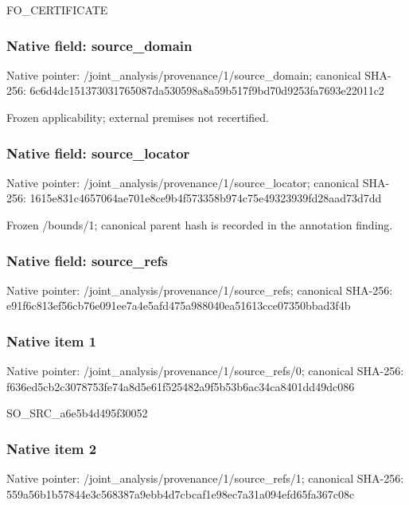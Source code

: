 \documentclass[10pt,a4paper]{article}
\begin{document}
\begingroup\raggedright\sloppy FO\_\allowbreak{}CERTIFICATE\par\endgroup

\subsubsection{Native field: source\_\allowbreak{}domain}
Native pointer: /joint\_\allowbreak{}analysis/provenance/1/source\_\allowbreak{}domain; canonical SHA-256: 6c6d4dc151373031765087da530598a8a59b517f9bd70d9253fa7693e22011c2

\begingroup\raggedright\sloppy Frozen applicability;\allowbreak{} external premises not recertified.\par\endgroup

\subsubsection{Native field: source\_\allowbreak{}locator}
Native pointer: /joint\_\allowbreak{}analysis/provenance/1/source\_\allowbreak{}locator; canonical SHA-256: 1615e831c4657064ae701e8ce9b4f573358b974c75e49323939fd28aad73d7dd

\begingroup\raggedright\sloppy Frozen /\allowbreak{}bounds/\allowbreak{}1;\allowbreak{} canonical parent hash is recorded in the annotation finding.\par\endgroup

\subsubsection{Native field: source\_\allowbreak{}refs}
Native pointer: /joint\_\allowbreak{}analysis/provenance/1/source\_\allowbreak{}refs; canonical SHA-256: e91f6c813ef56cb76e091ee7a4e5afd475a988040ea51613cce07350bbad3f4b

\subsubsection{Native item 1}
Native pointer: /joint\_\allowbreak{}analysis/provenance/1/source\_\allowbreak{}refs/0; canonical SHA-256: f636ed5cb2c3078753fe74a8d5e61f525482a9f5b53b6ac34ca8401dd49dc086

\begingroup\raggedright\sloppy SO\_\allowbreak{}SRC\_\allowbreak{}a6e5b4d495f30052\par\endgroup

\subsubsection{Native item 2}
Native pointer: /joint\_\allowbreak{}analysis/provenance/1/source\_\allowbreak{}refs/1; canonical SHA-256: 559a56b1b57844e3c568387a9ebb4d7cbcaf1e98ec7a31a094efd65fa367c08c
\end{document}
